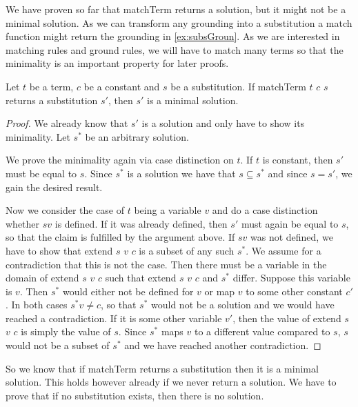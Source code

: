 We have proven so far that matchTerm returns a solution, but it might not be a minimal solution. As we can transform any grounding into a substitution a match function might return the grounding in \cref{ex:subsGroun}. As we are interested in matching rules and ground rules, we will have to match many terms so that the minimality is an important property for later proofs.

\begin{lemma}[\matchTermFindsMinimalSolution]\label{lem:matchTermMin}
    Let $t$ be a term, $c$ be a constant and $s$ be a substitution. If matchTerm $t$ $c$ $s$ returns a substitution $s'$, then $s'$ is a minimal solution.
\end{lemma}
\begin{proof}
We already know that $s'$ is a solution and only have to show its minimality. Let $s^\ast$ be an arbitrary solution.

We prove the minimality again via case distinction on $t$. If $t$ is constant, then $s'$ must be equal to $s$. Since $s^\ast$ is a solution we have that $s \subseteq s^\ast$ and since $s=s'$, we gain the desired result.

Now we consider the case of $t$ being a variable $v$ and do a case distinction whether $s v$ is defined. If it was already defined, then $s'$ must again be equal to $s$, so that the claim is fulfilled by the argument above.
If $s v$ was not defined, we have to show that extend $s$ $v$ $c$ is a subset of any such $s^\ast$. We assume for a contradiction that this is not the case. Then there must be a variable in the domain of extend $s$ $v$ $c$ such that extend $s$ $v$ $c$ and $s^\ast$ differ. Suppose this variable is $v$. Then $s^\ast$ would either not be defined for $v$ or map $v$ to some other constant $c'$. In both cases $s^\ast v \neq c$, so that $s^\ast$ would not be a solution and we would have reached a contradiction.
If it is some other variable $v'$, then the value of extend $s$ $v$ $c$ is simply the value of $s$. Since $s^\ast$ maps $v$ to a different value compared to $s$, $s$ would not be a subset of $s^\ast$ and we have reached another contradiction.
\end{proof}

So we know that if matchTerm returns a substitution then it is a minimal solution. This holds however already if we never return a solution. We have to prove that if no substitution exists, then there is no solution.


